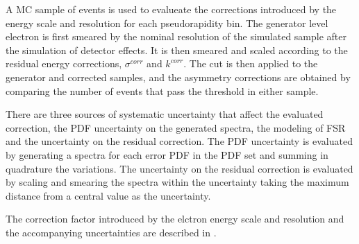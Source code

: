 
A \ac{MC} sample of \HepProcess{\PW\to\Pe\Pnue} events is used to evalueate the
corrections introduced by the energy scale and resolution for each
pseudorapidity bin. The generator level electron \pT is first smeared by the
nominal \pT resolution of the simulated sample after the simulation of detector
effects. It is then smeared and scaled according to the residual energy
corrections, $\sigma^{corr}$ and $k^{corr}$. The \pT cut is then applied to the
generator and corrected samples, and the asymmetry corrections are obtained by
comparing the number of events that pass the threshold in either sample.

There are three sources of systematic uncertainty that affect the evaluated
correction, the \ac{PDF} uncertainty on the generated \pT spectra, the modeling
of \ac{FSR} and the uncertainty on the residual correction. The \ac{PDF}
uncertainty is evaluated by generating a \pT spectra for each error \ac{PDF}  in
the \ac{PDF} set and summing in quadrature the variations. The uncertainty on
the residual correction is evaluated by scaling and smearing the \pT spectra
within the uncertainty taking the maximum distance from a central value as the
uncertainty. 

The correction factor introduced by the elctron energy scale and resolution and
the accompanying uncertainties are described in .

